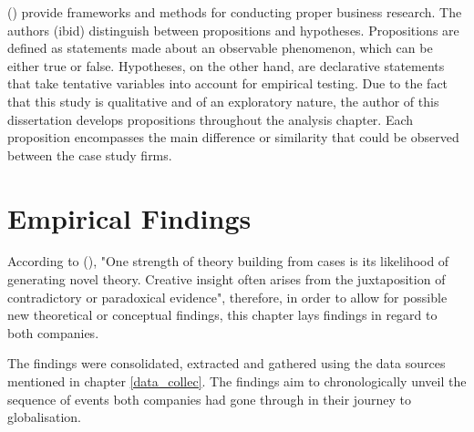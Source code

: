 \documentclass[11pt,a4paper]{article}
\begin{document}
{{\citeauthor{cooperBusinessResearchMethods2014} (\citeyear{cooperBusinessResearchMethods2014}) provide frameworks and methods for conducting proper business research. The authors (ibid) distinguish between propositions and hypotheses. Propositions are defined as statements made about an observable phenomenon, which can be either true or false. Hypotheses, on the other hand, are declarative statements that take tentative variables into account for empirical testing. Due to the fact that this study is qualitative and of an exploratory nature, the author of this dissertation develops propositions throughout the analysis chapter. Each proposition encompasses the main difference or similarity that could be observed between the case study firms. 


\section{Empirical Findings}
\label{emp_findings}
According to \citeauthor{eisenhardtBuildingTheoriesCase1989} (\citeyear{eisenhardtBuildingTheoriesCase1989}), "One strength of theory building from cases is its likelihood of generating novel theory. Creative insight often arises from the juxtaposition of contradictory or paradoxical evidence", therefore, in order to allow for possible new theoretical or conceptual findings, this chapter lays findings in regard to both companies. \par
The findings were consolidated, extracted and gathered using the data sources mentioned in chapter \ref{data_collec}. The findings aim to chronologically unveil the sequence of events both companies had gone through in their journey to globalisation. 

}}
\end{document}
